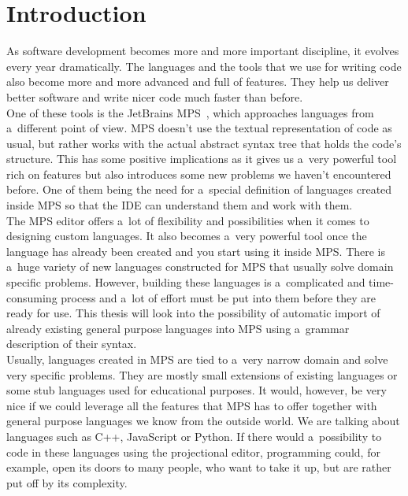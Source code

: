 \chapter{Introduction}

As software development becomes more and more important discipline, it evolves every year dramatically.
The languages and the tools that we use for writing code also become more and more advanced and full of features.
They help us deliver better software and write nicer code much faster than before.
\\

One of these tools is the JetBrains MPS~\cite{MPS}, which approaches languages from a~different point of view.
MPS doesn't use the textual representation of code as usual, but rather works with the actual abstract syntax tree that holds the code's structure.
This has some positive implications as it gives us a~very powerful tool rich on features but also introduces some new problems we haven't encountered before.
One of them being the need for a~special definition of languages created inside MPS so that the IDE can understand them and work with them.
\\

The MPS editor offers a~lot of flexibility and possibilities when it comes to designing custom languages.
It also becomes a~very powerful tool once the language has already been created and you start using it inside MPS.
There is a~huge variety of new languages constructed for MPS that usually solve domain specific problems.
However, building these languages is a~complicated and time-consuming process and a~lot of effort must be put into them before they are ready for use.
This thesis will look into the possibility of automatic import of already existing general purpose languages into MPS using a~grammar description of their syntax.
\\

Usually, languages created in MPS are tied to a~very narrow domain and solve very specific problems.
They are mostly small extensions of existing languages or some stub languages used for educational purposes.
It would, however, be very nice if we could leverage all the features that MPS has to offer together with general purpose languages we know from the outside world.
We are talking about languages such as C++, JavaScript or Python.
If there would a~possibility to code in these languages using the projectional editor, programming could, for example, open its doors to many people, who want to take it up, but are rather put off by its complexity.
\\

